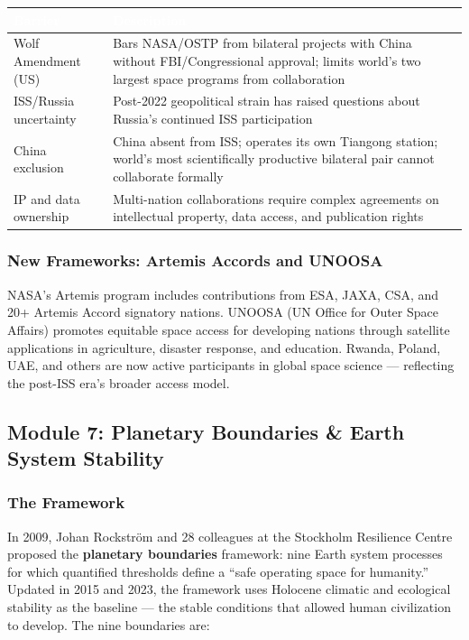 \documentclass[11pt,letterpaper]{article}
\newcommand{\tableheader}[1]{\textbf{\sffamily\textcolor{white}{#1}}}
\begin{document}
\begin{center}
\begin{tabularx}{\textwidth}{L{3.5cm}X}
\toprule
{}
\tableheader{Barrier} & \tableheader{Description} \\
\midrule
Wolf Amendment (US) & Bars NASA/OSTP from bilateral projects with China without FBI/Congressional approval; limits world's two largest space programs from collaboration \\
ISS/Russia uncertainty & Post-2022 geopolitical strain has raised questions about Russia's continued ISS participation \\
China exclusion & China absent from ISS; operates its own Tiangong station; world's most scientifically productive bilateral pair cannot collaborate formally \\
IP and data ownership & Multi-nation collaborations require complex agreements on intellectual property, data access, and publication rights \\
\bottomrule
\end{tabularx}
\end{center}

\subsubsection{New Frameworks: Artemis Accords and UNOOSA}

NASA's Artemis program includes contributions from ESA, JAXA, CSA, and 20+ Artemis Accord signatory nations. UNOOSA (UN Office for Outer Space Affairs) promotes equitable space access for developing nations through satellite applications in agriculture, disaster response, and education. Rwanda, Poland, UAE, and others are now active participants in global space science --- reflecting the post-ISS era's broader access model.

\subsection{Module 7: Planetary Boundaries \& Earth System Stability}

\subsubsection{The Framework}

In 2009, Johan Rockstr{\"o}m and 28 colleagues at the Stockholm Resilience Centre proposed the \textbf{planetary boundaries} framework: nine Earth system processes for which quantified thresholds define a ``safe operating space for humanity.'' Updated in 2015 and 2023, the framework uses Holocene climatic and ecological stability as the baseline --- the stable conditions that allowed human civilization to develop. The nine boundaries are:
\end{document}
